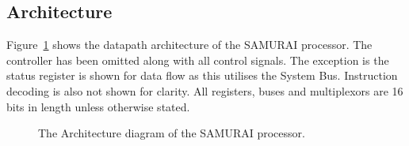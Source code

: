 \subsection{Architecture}

Figure~\ref{fig:architecture} shows the datapath architecture of the SAMURAI processor. 
The controller has been omitted along with all control signals. 
The exception is the status register is shown for data flow as this utilises the System Bus. 
Instruction decoding is also not shown for clarity. 
All registers, buses and multiplexors are 16 bits in length unless otherwise stated. 

\begin{figure}
\caption{The Architecture diagram of the SAMURAI processor.}
\label{fig:architecture}
\end{figure}
